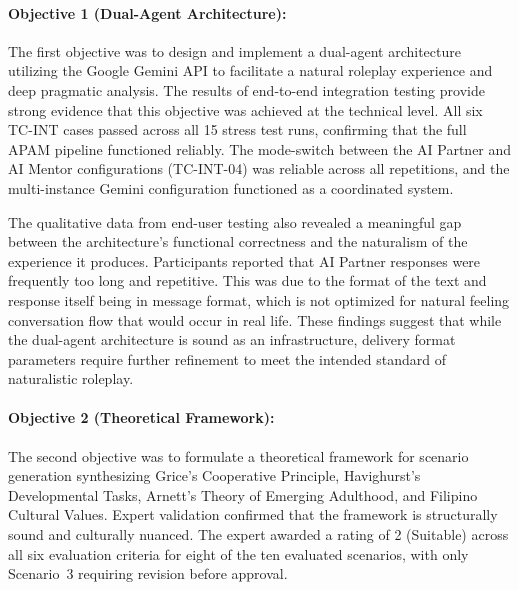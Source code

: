 \paragraph{Objective 1 (Dual-Agent Architecture):} 

The first objective was to design and implement a dual-agent architecture 
utilizing the Google Gemini API to facilitate a natural roleplay experience 
and deep pragmatic analysis. The results of end-to-end integration testing 
provide strong evidence that this objective was achieved at the technical 
level. All six TC-INT cases passed across all 15 stress test runs, confirming 
that the full APAM pipeline functioned reliably. The mode-switch between the AI Partner 
and AI Mentor configurations (TC-INT-04) was reliable across all repetitions, 
and the multi-instance Gemini configuration functioned as a coordinated system.

The qualitative data from end-user testing 
also revealed a meaningful gap between the architecture's functional correctness 
and the naturalism of the experience it produces. Participants reported that 
AI Partner responses were frequently too long and repetitive. This was due to the format of the text and response itself being in message format,
which is not optimized for natural feeling conversation flow that would occur in real life. These findings suggest that while the 
dual-agent architecture is sound as an infrastructure, delivery format parameters require further refinement to meet the 
intended standard of naturalistic roleplay.

\paragraph{Objective 2 (Theoretical Framework):} 

The second objective was to formulate a theoretical framework for scenario 
generation synthesizing Grice's Cooperative Principle, Havighurst's Developmental Tasks, Arnett's Theory of Emerging Adulthood, 
and Filipino Cultural Values. Expert validation 
confirmed that the framework is structurally sound and culturally nuanced. 
The expert awarded a rating of 2 (Suitable) across all six evaluation criteria 
for eight of the ten evaluated scenarios, with only Scenario~3 requiring 
revision before approval.

